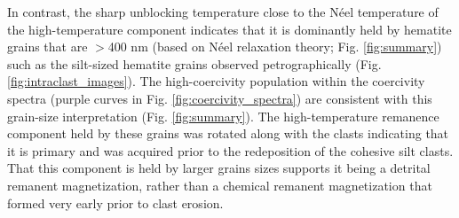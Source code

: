 \documentclass[draft]{agujournal2018}
\begin{document}
In contrast, the sharp unblocking temperature close to the N\'eel temperature of the high-temperature component indicates that it is dominantly held by hematite grains that are $>$400 nm (based on N\'eel relaxation theory; Fig. \ref{fig:summary}) such as the silt-sized hematite grains observed petrographically (Fig. \ref{fig:intraclast_images}). The high-coercivity population within the coercivity spectra (purple curves in Fig. \ref{fig:coercivity_spectra}) are consistent with this grain-size interpretation (Fig. \ref{fig:summary}). The high-temperature remanence component held by these grains was rotated along with the clasts indicating that it is primary and was acquired prior to the redeposition of the cohesive silt clasts. That this component is held by larger grains sizes supports it being a detrital remanent magnetization, rather than a chemical remanent magnetization that formed very early prior to clast erosion. 
\end{document}
